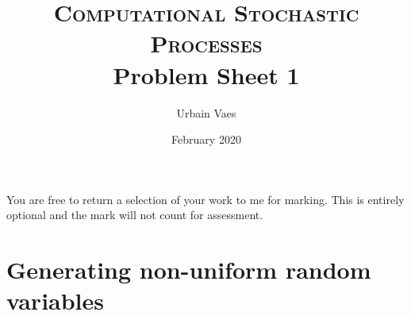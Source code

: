 \documentclass[11pt,a4paper]{article}
\theoremstyle{definition}
\theoremstyle{plain}
\begin{document}
\title{%
    \textsc{Computational Stochastic Processes} \\
    Problem Sheet 1
}
\author{Urbain Vaes}
\date{February 2020}

\maketitle

You are free to return a selection of your work to me for marking.
This is entirely optional and the mark will not count for assessment.

\section*{Generating non-uniform random variables}%
\label{sec:generating_non_uniform_random_variables}
\end{document}
